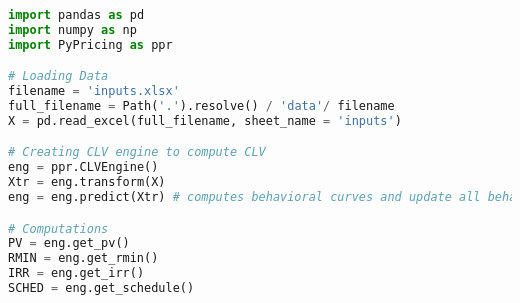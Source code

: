 
\begin{lstlisting}[language=Python, caption=Python example]
import pandas as pd
import numpy as np
import PyPricing as ppr

# Loading Data
filename = 'inputs.xlsx'
full_filename = Path('.').resolve() / 'data'/ filename
X = pd.read_excel(full_filename, sheet_name = 'inputs')

# Creating CLV engine to compute CLV   
eng = ppr.CLVEngine()
Xtr = eng.transform(X) 
eng = eng.predict(Xtr) # computes behavioral curves and update all behavioral curves

# Computations
PV = eng.get_pv()
RMIN = eng.get_rmin()
IRR = eng.get_irr()
SCHED = eng.get_schedule()

\end{lstlisting}